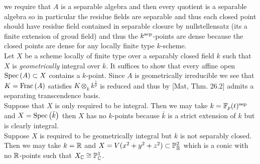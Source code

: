 \documentclass[12pt]{article}
\begin{document}
we require that $A$ is a separable algebra and then every quotient is a separable algebra so in particular the residue fields are separable and thus each closed point should have residue field contained in separable closure by nullstellensatz (its a finite extension of groud field) and thus the $k^{\mathrm{sep}}$-points are dense because the closed points are dense for any locally finite type $k$-scheme.
\bigskip\\
Let $X$ be a scheme locally of finite type over a separably closed field $k$ such that $X$ is \textit{geometrically} integral over $k$. It suffices to show that every affine open $\mathrm{Spec}\left( A \right) \subset X$ contains a $k$-point. Since $A$ is geometrically irreducible we see that $K = \mathrm{Frac}\left(A\right)$ satisfies $K \otimes_k k^{\frac{1}{p}}$ is reduced and thus by [Mat, Thm. 26.2] admits a separating transcendence basis. 
\bigskip\\
Suppose that $X$ is only required to be integral. Then we may take $k = \mathbb{F}_p(t)^{\mathrm{sep}}$ and $X = \mathrm{Spec}\left( \bar{k} \right)$ then $X$ has no $k$-points because $\bar{k}$ is a strict extension of $k$ but is clearly integral.
\bigskip\\
Suppose $X$ is required to be geometrically integral but $k$ is not separably closed. Then we may take $k = \mathbb{R}$ and $X = V(x^2 + y^2 + z^2) \subset \mathbb{P}^2_{\mathbb{R}}$ which is a conic with no $\mathbb{R}$-points such that $X_{\mathbb{C}} \cong \mathbb{P}^1_{\mathbb{C}}$.
\end{document}

